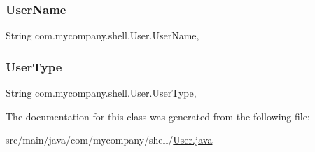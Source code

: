 \subsubsection{\texorpdfstring{User\+Name}{UserName}}
{\footnotesize\ttfamily String com.\+mycompany.\+shell.\+User.\+User\+Name\hspace{0.3cm}{\ttfamily [static]}, {\ttfamily [private]}}

\mbox{\label{classcom_1_1mycompany_1_1shell_1_1User_a7adda82096915c29abc7abdfd999d24d}} 
\subsubsection{\texorpdfstring{User\+Type}{UserType}}
{\footnotesize\ttfamily String com.\+mycompany.\+shell.\+User.\+User\+Type\hspace{0.3cm}{\ttfamily [static]}, {\ttfamily [private]}}



The documentation for this class was generated from the following file\+:\begin{DoxyCompactItemize}
\item 
src/main/java/com/mycompany/shell/\hyperlink{User_8java}{User.\+java}\end{DoxyCompactItemize}
